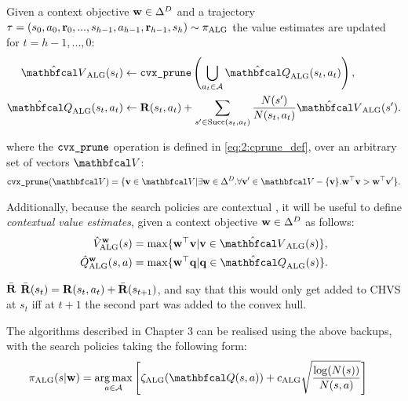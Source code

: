     Given a context objective $\mathbf{w}\in\Delta^D$ and a trajectory $\tau=(s_0,a_0,\mathbf{r}_0,...,s_{h-1},a_{h-1},\mathbf{r}_{h-1},s_h)\sim{\pi_{{\textnormal{ALG}}}}$  the value estimates are updated for $t=h-1,...,0$:
    \begin{align}
        \Valg(s_t) &\leftarrow \cprune \left( \bigcup_{a_t\in\cl{A}} \Qalg(s_t,a_t) \right), 
            \label{eq:5:chmcts_v_backup} \\
        \Qalg(s_t,a_t) &\leftarrow \bff{R}(s_t,a_t) + \sum_{s'\in\suc{s_t}{a_t}} \frac{N(s')}{N(s_t,a_t)}\Valg(s'). 
            \label{eq:5:chmcts_q_backup}
    \end{align}

    where the ${\textnormal{\texttt{cvx\_prune}}}$ operation is defined in \eqref{eq:2:cprune_def},  over an arbitrary set of vectors $\bfcl{V}$:
    \begin{align}
        \cprune(\bfcl{V}) = \{\bff{v}\in\bfcl{V} | \exists \bff{w}\in\Delta^D. \forall \bff{v}'\in\bfcl{V}-\{\bff{v}\}. \bff{w}^\top \bff{v} > \bff{w}^\top \bff{v}' \}. \label{eq:5:cprune_def}
    \end{align}

    Additionally, because the search policies are contextual , it will be useful to define \textit{contextual value estimates}, given a context objective $\mathbf{w}\in\Delta^D$ as follows:
    \begin{align}
        \Valgctx{\bff{w}}(s) &= \max \{\bff{w}^\top \bff{v} | \bff{v}\in\Valg(s) \}, \label{eq:5:contextual_value} \\
        \Qalgctx{\bff{w}}(s,a) &= \max \{\bff{w}^\top \bff{q} | \bff{q}\in\Qalg(s) \}. \label{eq:5:contextual_qvalue}
    \end{align} 

     $\bar{\mathbf{R}}$  $\bar{\mathbf{R}}(s_t) = \mathbf{R}(s_t,a_t) + \bar{\mathbf{R}}(s_{t+1})$, and say that this would only get added to CHVS at $s_t$ iff at $t+1$ the second part was added to the convex hull.


    The algorithms described in Chapter 3  can be realised using the above backups, with the search policies taking the following form:
    \begin{align}
        \pialg(s|\bff{w}) &= \argmax_{a\in\cl{A}} \left[
            \zetaalg(\bfcl{Q}(s,a)) + \calg \sqrt{\frac{\log(N(s))}{N(s,a)}} \right]
    \end{align}

